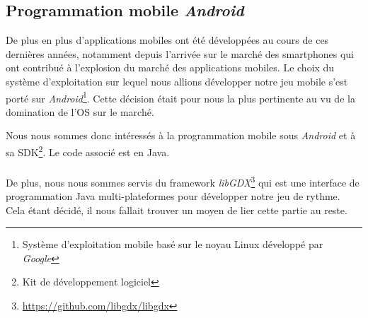 \subsection{Programmation mobile \textit{Android}}

De plus en plus d'applications mobiles ont été développées au cours de ces dernières années, notamment depuis l'arrivée sur le marché des smartphones qui ont contribué à l'explosion du marché des applications mobiles. Le choix du système d'exploitation sur lequel nous allions développer notre jeu mobile s'est porté sur \textit{Android}\footnote{Système d'exploitation mobile basé sur le noyau Linux développé par \textit{Google}}. Cette décision était pour nous la plus pertinente au vu de la domination de l'OS sur le marché.

Nous nous sommes donc intéressés à la programmation mobile sous \textit{Android} et à sa SDK\footnote{Kit de développement logiciel}. Le code associé est en Java.

\paragraph{}
De plus, nous nous sommes servis du framework \textit{libGDX}\footnote{\url{https://github.com/libgdx/libgdx}} qui est une interface de programmation Java multi-plateformes pour développer notre jeu de rythme. Cela étant décidé, il nous fallait trouver un moyen de lier cette partie au reste.